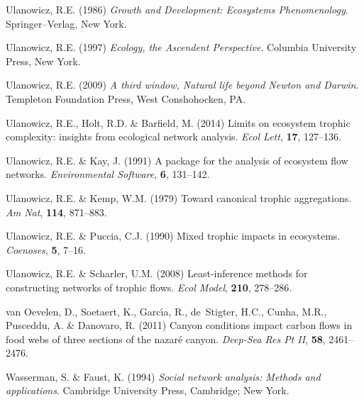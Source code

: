 \documentclass[11pt]{article}
\begin{document}
\begin{thebibliography}{75}
Ulanowicz, R.E. (1986) \emph{Growth and Development: Ecosystems Phenomenology}.
\newblock Springer--Verlag, New York.

Ulanowicz, R.E. (1997) \emph{Ecology, the Ascendent Perspective}.
\newblock Columbia University Press, New York.

Ulanowicz, R.E. (2009) \emph{A third window, {N}atural life beyond {N}ewton and
  {D}arwin}.
\newblock Templeton Foundation Press, West Conshohocken, PA.

Ulanowicz, R.E., Holt, R.D. \& Barfield, M. (2014) Limits on ecosystem trophic
  complexity: insights from ecological network analysis.
\newblock \emph{Ecol Lett}, \textbf{17}, 127--136.

Ulanowicz, R.E. \& Kay, J. (1991) A package for the analysis of ecosystem flow
  networks.
\newblock \emph{Environmental Software}, \textbf{6}, 131--142.

Ulanowicz, R.E. \& Kemp, W.M. (1979) Toward canonical trophic aggregations.
\newblock \emph{Am Nat}, \textbf{114}, 871--883.

Ulanowicz, R.E. \& Puccia, C.J. (1990) Mixed trophic impacts in ecosystems.
\newblock \emph{Coenoses}, \textbf{5}, 7--16.

Ulanowicz, R.E. \& Scharler, U.M. (2008) Least-inference methods for
  constructing networks of trophic flows.
\newblock \emph{Ecol Model}, \textbf{210}, 278--286.

van Oevelen, D., Soetaert, K., Garc{\'\i}a, R., de~Stigter, H.C., Cunha, M.R.,
  Pusceddu, A. \& Danovaro, R. (2011) Canyon conditions impact carbon flows in
  food webs of three sections of the nazar{\'e} canyon.
\newblock \emph{Deep-Sea Res Pt II}, \textbf{58}, 2461--2476.

Wasserman, S. \& Faust, K. (1994) \emph{Social network analysis: {M}ethods and
  applications}.
\newblock Cambridge University Press, Cambridge; New York.


\end{thebibliography}
\end{document}
